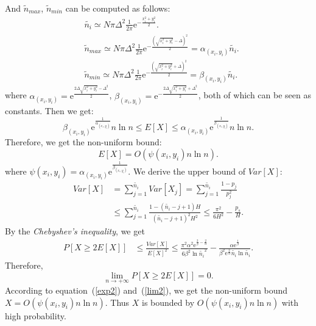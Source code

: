 \begin{IEEEproof}
And $\widetilde{n}_{max}$, $\widetilde{n}_{min}$ can be computed as follows:
\begin{align*}
&\widetilde{n_i} \simeq N\pi \Delta^2 \frac{1}{2\pi}\mathrm{e}^{-\frac{x_i^2+y_i^2}{2}}.							\\
&\widetilde{n}_{max}  \simeq N\pi \Delta^2 
\frac{1}{2\pi}\mathrm{e}^{-\frac{{(\sqrt{x_i^2+y_i^2}-\Delta)}^2}{2}}  
= \alpha_{(x_i,y_i)}\widetilde{n_i}.\\
&\widetilde{n}_{min}  \simeq N\pi \Delta^2 
\frac{1}{2\pi}\mathrm{e}^{-\frac{{(\sqrt{x_i^2+y_i^2}+\Delta)}^2}{2}}  
= \beta_{(x_i,y_i)}\widetilde{n_i}.
\end{align*}
where $\alpha_{(x_i,y_i)} = \mathrm{e}^{\frac{2\Delta\sqrt{x_i^2+y_i^2} - \Delta^2}{2}}$, 
$\beta_{(x_i,y_i)} = \mathrm{e}^{-\frac{2\Delta\sqrt{x_i^2+y_i^2} + \Delta^2}{2}}$, both of which can be seen as constants. 
Then we get:
$$
\beta_{(x_i,y_i)}\mathrm{e}^{\frac{1}{\alpha_{(x_i,y_i)}}}n\ln n 
\leq E[X] \leq \alpha_{(x_i,y_i)}\mathrm{e}^{\frac{1}{\beta_{(x_i,y_i)}}}n\ln n.
$$
Therefore, we get the non-uniform bound:
\begin{equation}
	\label{exp2}
	E[X] = O(\psi(x_i,y_i)n\ln n).
\end{equation}
where $\psi(x_i,y_i) = \alpha_{(x_i,y_i)}\mathrm{e}^{\frac{1}{\beta_{(x_i,y_i)}}}$.
We derive the upper bound of $Var[X]$:
\begin{equation*}
	\begin{split}
		Var[X] &= \sum_{j=1}^{\widetilde{n_i}}Var[X_j]
		= \sum_{j=1}^{\widetilde{n_i}} \frac{1-p_j}{p_j^2} \\
		&\le \sum_{j=1}^{\widetilde{n_i}} 
		\frac{1-(\widetilde{n_i}-j+1)H}{(\widetilde{n_i}-j+1)^2H^2}
		\le \frac{\pi^2}{6H^2}-\frac{p_{s}}{H}.
	\end{split}
\end{equation*}
By the \emph{Chebyshev's inequality}, we get
\begin{equation*}
	\begin{split}
		P[X \geq 2E[X]] &\leq \frac{Var[X]}{{E[X]}^2} 
		\leq \frac{\pi^2\alpha^2\mathrm{e}^{\frac{2}{\beta}-
		\frac{2}{\alpha}}}{6\beta^2{\ln \widetilde{n_i}}^2}-
		\frac{\alpha\mathrm{e}^{\frac{1}{\beta}}}{{\beta}^2\mathrm{e}^{\frac{2}{\alpha}}\widetilde{n_i}\ln \widetilde{n_i}}.
	\end{split}
\end{equation*}
Therefore,
\begin{equation}
	\label{lim2}
	\lim_{n \to +\infty}P[X \geq 2E[X]] = 0.
\end{equation}
According to equation~(\ref{exp2}) and~(\ref{lim2}), we get the non-uniform bound
$X = O(\psi(x_i,y_i)n\ln n)$.
Thus $X$ is bounded by $O(\psi(x_i,y_i)n\ln n)$ with high probability.
	

\end{IEEEproof}
